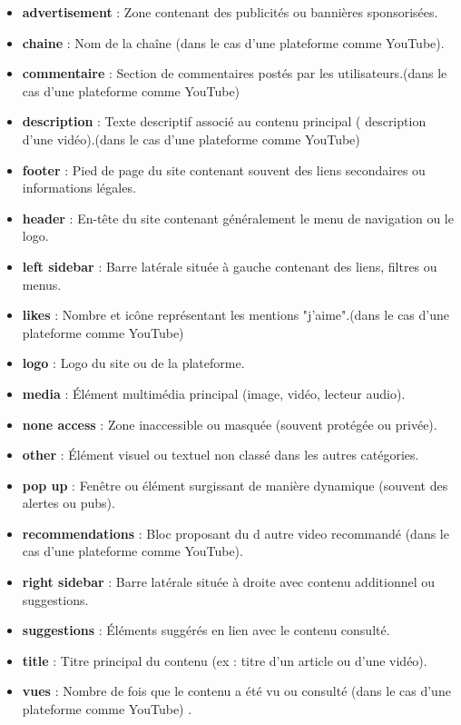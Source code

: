 \documentclass[12pt,a4paper]{report}
\begin{document}
\begin{itemize}
 \item \textbf{advertisement} : Zone contenant des publicités ou bannières sponsorisées.
  \item \textbf{chaine} : Nom de la chaîne (dans le cas d’une plateforme comme YouTube).
  \item \textbf{commentaire} : Section de commentaires postés par les utilisateurs.(dans le cas d’une plateforme comme YouTube) 
  \item \textbf{description} : Texte descriptif associé au contenu principal ( description d’une vidéo).(dans le cas d’une plateforme comme YouTube)
  \item \textbf{footer} : Pied de page du site contenant souvent des liens secondaires ou informations légales.
  \item \textbf{header} : En-tête du site contenant généralement le menu de navigation ou le logo.
  \item \textbf{left sidebar} : Barre latérale située à gauche contenant des liens, filtres ou menus.
  \item \textbf{likes} : Nombre et icône représentant les mentions "j'aime".(dans le cas d’une plateforme comme YouTube)
  \item \textbf{logo} : Logo du site ou de la plateforme.
  \item \textbf{media} : Élément multimédia principal (image, vidéo, lecteur audio).
  \item \textbf{none access} : Zone inaccessible ou masquée (souvent protégée ou privée).
  \item \textbf{other} : Élément visuel ou textuel non classé dans les autres catégories.
  \item \textbf{pop up} : Fenêtre ou élément surgissant de manière dynamique (souvent des alertes ou pubs).
  \item \textbf{recommendations} : Bloc proposant du d autre video recommandé (dans le cas d’une plateforme comme YouTube).
  \item \textbf{right sidebar} : Barre latérale située à droite avec contenu additionnel ou suggestions.
  \item \textbf{suggestions} : Éléments suggérés en lien avec le contenu consulté.
  \item \textbf{title} : Titre principal du contenu (ex : titre d’un article ou d’une vidéo).
  \item \textbf{vues} : Nombre de fois que le contenu a été vu ou consulté (dans le cas d’une plateforme comme YouTube) .
  
\end{itemize}
\end{document}
